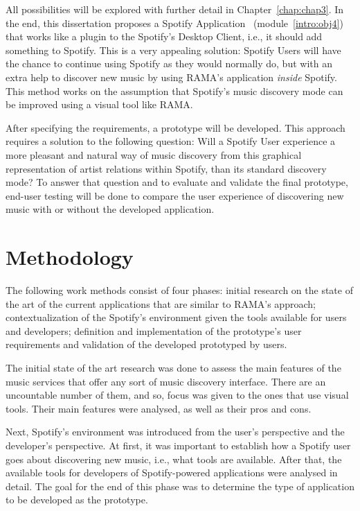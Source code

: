   All possibilities will be explored with further detail in Chapter~\ref{chap:chap3}.
  In the end, this dissertation proposes a Spotify Application~\cite{spotifyapps} (module~\ref{intro:obj4}) that works like a plugin to the Spotify's Desktop Client, i.e., it should add something to Spotify.
  This is a very appealing solution: Spotify Users will have the chance to continue using Spotify as they would normally do, but with an extra help to discover new music by using RAMA's application \emph{inside} Spotify. 
  This method works on the assumption that Spotify's music discovery mode can be improved using a visual tool like RAMA.

  After specifying the requirements, a prototype will be developed.
  This approach requires a solution to the following question: Will a Spotify User experience a more pleasant and natural way of music discovery from this graphical representation of artist relations within Spotify, than its standard discovery mode?
  To answer that question and to evaluate and validate the final prototype, end-user testing will be done to compare the user experience of discovering new music with or without the developed application.

\section{Methodology}
\label{sec:methodology}

  The following work methods consist of four phases: initial research on the state of the art of the current applications that are similar to RAMA's approach; contextualization of the Spotify's environment given the tools available for users and developers; definition and implementation of the prototype's user requirements and validation of the developed prototyped by users.

  The initial state of the art research was done to assess the main features of the music services that offer any sort of music discovery interface.
  There are an uncountable number of them, and so, focus was given to the ones that use visual tools.
  Their main features were analysed, as well as their pros and cons.

  Next, Spotify's environment was introduced from the user's perspective and the developer's perspective.
  At first, it was important to establish how a Spotify user goes about discovering new music, i.e., what tools are available.
  After that, the available tools for developers of Spotify-powered applications were analysed in detail.
  The goal for the end of this phase was to determine the type of application to be developed as the prototype. 

